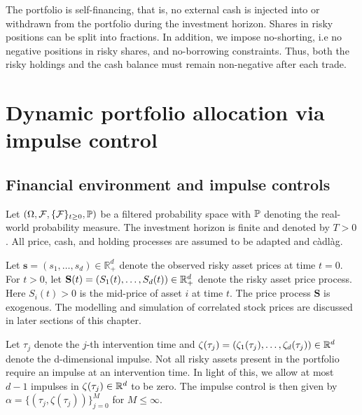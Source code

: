 The portfolio is self-financing, that is, no external cash is injected into or withdrawn from the portfolio during the investment horizon. Shares in risky positions can be split into fractions. In addition, we impose no-shorting, i.e no negative positions in risky shares, and no-borrowing constraints. Thus, both the risky holdings and the cash balance must remain non-negative after each trade.

\section{Dynamic portfolio allocation via impulse control}
\subsection{Financial environment and impulse controls}
Let $(\Omega, \mathcal{F}, \{\mathcal{F}\}_{t \geq 0}, \mathbb{P})$ be a filtered probability space with $\mathbb{P}$ denoting the real-world probability measure. The investment horizon is finite and denoted by $T>0$. All price, cash, and holding processes are assumed to be adapted and càdlàg. 

Let $\mathbf{s}=(s_1, \ldots, s_d) \in \mathbb R_+^d$ denote the observed risky asset prices at time $t=0$. For $t>0$, let $\mathbf S(t) = (S_1(t), \ldots, S_d(t))\in \mathbb{R}_+^d$ denote the risky asset price process. Here $S_i(t)>0$ is the mid-price of asset $i$ at time $t$. The price process $\mathbf S$ is exogenous. The modelling and simulation of correlated stock prices are discussed in later sections of this chapter. 

Let $\tau_j$ denote the $j$-th intervention time and $\zeta(\tau_j)=(\zeta_1(\tau_j), \ldots, \zeta_d(\tau_j)) \in \mathbb{R}^d$ denote the d-dimensional impulse. Not all risky assets present in the portfolio require an impulse at an intervention time. In light of this, we allow at most $d-1$ impulses in $\zeta(\tau_j)\in \mathbb{R}^d$ to be zero. The impulse control is then given by $\alpha = \{(\tau_j, \zeta(\tau_j))\}_{j = 0}^M$ for $M\leq \infty$. 

